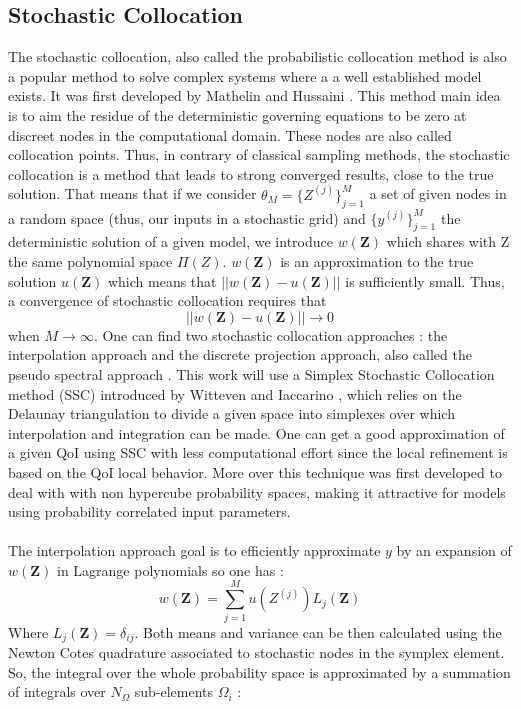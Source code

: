 \documentclass[11pt, a4paper, English]{report}
\begin{document}
\subsection{Stochastic Collocation}
The stochastic collocation, also called the probabilistic collocation method  is also a popular method to solve complex systems where a a well established model exists. It was first developed by  Mathelin and Hussaini \cite{NasaSCM}. 
This method main idea is to aim the residue of the deterministic governing equations to be zero at discreet nodes in the computational domain. These nodes are also called collocation points. Thus, in contrary of classical sampling methods, the stochastic collocation is a method that leads to strong converged results, close to the true solution. That means that if we consider $\theta_M = \{Z^{(j)}\}_{j=1}^M$ a set of given nodes in a random space (thus, our inputs in a stochastic grid) and $\{y^{(j)}\}_{j=1}^M$ the deterministic solution of a given model, we introduce $w(\boldsymbol{Z})$ which shares with Z the same polynomial space $\Pi(Z)$. $w(\boldsymbol{Z})$ is an approximation to the true solution $u(\boldsymbol{Z})$ which means that $||w(\boldsymbol{Z}) - u(\boldsymbol{Z})||$ is sufficiently small. Thus, a convergence of stochastic collocation requires that 
$$||w(\boldsymbol{Z}) - u(\boldsymbol{Z})||\longrightarrow 0$$ when $M \longrightarrow \infty$. One can find two stochastic collocation approaches : the interpolation approach and the discrete projection approach, also called the pseudo spectral approach \cite{xiu}. This work will use a Simplex Stochastic Collocation method (SSC) introduced by Witteven and Iaccarino \cite{SSC}, which relies on the Delaunay triangulation to divide a given space into simplexes over which interpolation and integration can be made. One can get a good approximation of a given QoI using SSC with less computational effort since the local refinement is based on the QoI local behavior. More over this technique was first developed to deal with with non hypercube probability spaces, making it attractive for models using probability correlated input parameters.\\\\
The interpolation approach goal is to efficiently approximate $y$ by an expansion of $w(\boldsymbol{Z})$  in Lagrange polynomials so one has :
$$ w(\boldsymbol{Z}) = \sum_{j=1}^M u(Z^{(j)}) L_j(\boldsymbol{Z}) $$
Where $ L_j(\boldsymbol{Z}) = \delta_{ij}$. Both means and variance can be then calculated using the Newton Cotes quadrature associated to stochastic nodes in the symplex element. So, the integral over the whole probability space is approximated by a summation of integrals over $N_\Omega$ sub-elements $\Omega_i $ \cite{Witteven} :
\end{document}
